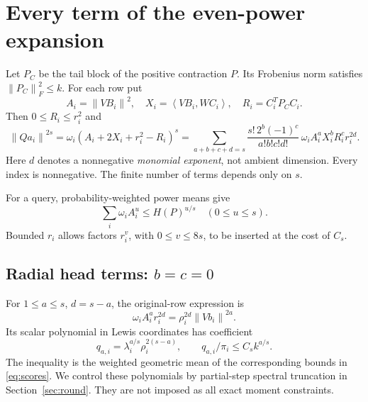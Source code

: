 \documentclass[11pt]{article}
\theoremstyle{remark}\newtheorem{remark}[theorem]{Remark}
\newcommand{\norm}[1]{\left\|#1\right\|}\newcommand{\ip}[2]{\left\langle #1,#2\right\rangle}
\begin{document}
\section{Every term of the even-power expansion}\label{sec:monomials}
Let $P_C$ be the tail block of the positive contraction $P$. Its Frobenius norm satisfies $\norm{P_C}_F^2\le k$. For each row put
\[
 A_i=\norm{VB_i}^2,\quad X_i=\ip{VB_i}{WC_i},\quad R_i=C_i^TP_CC_i.
\]
Then $0\le R_i\le r_i^2$ and
\begin{equation}\label{eq:expansion}
 \norm{Qa_i}^{2s}=\omega_i(A_i+2X_i+r_i^2-R_i)^s
 =\sum_{a+b+c+d=s}\frac{s!\,2^b(-1)^c}{a!b!c!d!}\,
 \omega_i A_i^aX_i^bR_i^cr_i^{2d}.
\end{equation}
Here $d$ denotes a nonnegative \emph{monomial exponent}, not ambient dimension. Every index is nonnegative. The finite number of terms depends only on $s$.

For a query, probability-weighted power means give
\begin{equation}\label{eq:powermean}
 \sum_i\omega_i A_i^u\le H(P)^{u/s}\quad(0\le u\le s).
\end{equation}
Bounded $r_i$ allows factors $r_i^v$, with $0\le v\le8s$, to be inserted at the cost of $C_s$.

\subsection[Radial head terms]{Radial head terms: $b=c=0$}
For $1\le a\le s$, $d=s-a$, the original-row expression is
\[
 \omega_i A_i^ar_i^{2d}=\rho_i^{2d}\norm{Vb_i}^{2a}.
\]
Its scalar polynomial in Lewis coordinates has coefficient
\begin{equation}\label{eq:radial}
 q_{a,i}=\lambda_i^{a/s}\rho_i^{2(s-a)},\qquad q_{a,i}/\pi_i\le C_s k^{a/s}.
\end{equation}
The inequality is the weighted geometric mean of the corresponding bounds in \eqref{eq:scores}. We control these polynomials by partial-step spectral truncation in Section~\ref{sec:round}. They are not imposed as all exact moment constraints.
\end{document}
